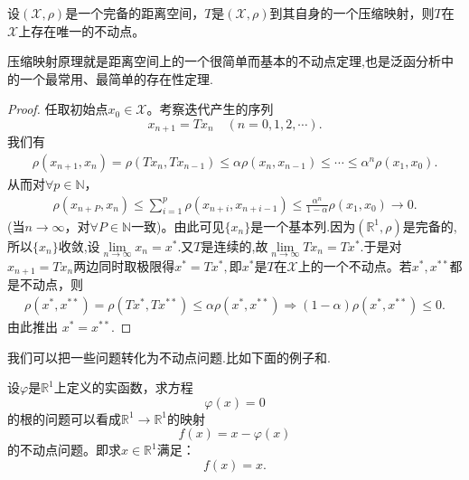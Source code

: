 \documentclass[../../main.tex]{subfiles}
\begin{document}
\begin{theorem}\label{theorem:Banach不动点定理——压缩映象原理}
设$(\mathscr{X},\rho)$是一个完备的距离空间，$T$是$(\mathscr{X},\rho)$到其自身的一个压缩映射，则$T$在$\mathscr{X}$上存在唯一的不动点。
\end{theorem}
\begin{note}
压缩映射原理就是距离空间上的一个很简单而基本的不动点定理,也是泛函分析中的一个最常用、最简单的存在性定理.
\end{note}
\begin{proof}
任取初始点$x_0 \in \mathscr{X}$。考察迭代产生的序列
$$x_{n+1} = Tx_n \quad (n = 0,1,2,\cdots).$$
我们有
\begin{align*}
\rho(x_{n+1}, x_n) = \rho(Tx_n, Tx_{n-1}) \leqslant \alpha \rho(x_n, x_{n-1}) \leqslant \cdots \leqslant \alpha^n \rho(x_1, x_0).
\end{align*}
从而对$\forall p \in \mathbb{N}$，
\begin{align*}
\rho(x_{n+P}, x_n) \leqslant \sum_{i=1}^p \rho(x_{n+i}, x_{n+i-1}) \leqslant \frac{\alpha^n}{1 - \alpha} \rho(x_1, x_0) \to 0.
\end{align*}
(当$n \to \infty$，对$\forall P \in \mathbb{N}$一致)。由此可见$\{x_n\}$是一个基本列.因为$(\mathbb{R}^1,\rho)$是完备的,所以$\{x_n\}$收敛,设$\underset{n\rightarrow \infty}{\lim}x_n=x^*.$又$T$是连续的,故$\underset{n\rightarrow \infty}{\lim}Tx_n=Tx^*.$于是对$x_{n+1} = Tx_n$两边同时取极限得$x^*=Tx^*,$即$x^*$是$T$在$\mathscr{X}$上的一个不动点。若$x^*, x^{**}$都是不动点，则
\begin{align*}
\rho \left( x^*,x^{**} \right) =\rho \left( Tx^*,Tx^{**} \right) \leqslant \alpha \rho \left( x^*,x^{**} \right) \Longrightarrow \left( 1-\alpha \right) \rho \left( x^*,x^{**} \right) \leqslant 0.
\end{align*}
由此推出
$x^* = x^{**}.$
\end{proof}
\begin{remark}
我们可以把一些问题转化为不动点问题.比如下面的例子和.

设$\varphi$是$\mathbb{R}^1$上定义的实函数，求方程
$$\varphi(x) = 0$$
的根的问题可以看成$\mathbb{R}^1 \to \mathbb{R}^1$的映射
$$f(x) = x - \varphi(x)$$
的不动点问题。即求$x \in \mathbb{R}^1$满足：
$$f(x) = x.$$
\end{remark}
\end{document}
